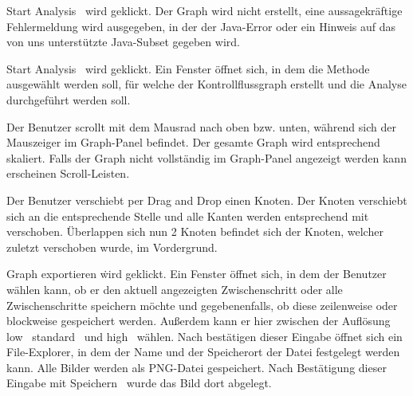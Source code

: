 {\glqq Start Analysis \grqq\ wird geklickt.}
{Der Graph wird nicht erstellt, eine aussagekräftige Fehlermeldung wird ausgegeben, in der der Java-Error oder ein Hinweis auf das von uns unterstützte Java-Subset gegeben wird.}

{\glqq Start Analysis \grqq\ wird geklickt.}
{Ein Fenster öffnet sich, in dem die Methode ausgewählt werden soll, für welche der Kontrollflussgraph erstellt und die Analyse durchgeführt werden soll.}



{Der Benutzer scrollt mit dem Mausrad nach oben bzw. unten, während sich der Mauszeiger im Graph-Panel befindet.}
{Der gesamte Graph wird entsprechend skaliert. Falls der Graph nicht vollständig im Graph-Panel angezeigt werden kann erscheinen Scroll-Leisten.}

{Der Benutzer verschiebt per \glqq Drag and Drop \grqq einen Knoten.}
{Der Knoten verschiebt sich an die entsprechende Stelle und alle Kanten werden entsprechend mit verschoben. Überlappen sich nun 2 Knoten befindet sich der Knoten, welcher zuletzt verschoben wurde, im Vordergrund.}


{\glqq Graph exportieren \grqq\. wird geklickt.}
{Ein Fenster öffnet sich, in dem der Benutzer wählen kann, ob er den aktuell angezeigten Zwischenschritt oder alle Zwischenschritte speichern möchte und gegebenenfalls, ob diese zeilenweise oder blockweise gespeichert werden. Außerdem kann er hier zwischen der Auflösung \glqq low \grqq\, \glqq standard \grqq\ und  \glqq  high \grqq\ wählen. Nach bestätigen dieser Eingabe öffnet sich ein File-Explorer, in dem der Name und der Speicherort der Datei festgelegt werden kann. Alle Bilder werden als PNG-Datei gespeichert. Nach Bestätigung dieser Eingabe mit  \glqq Speichern \grqq\ wurde das Bild dort abgelegt.}


